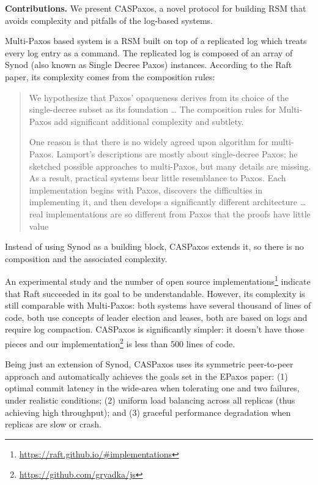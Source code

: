 \documentclass[12pt]{article}
\theoremstyle{definition}
\begin{document}
{\bf Contributions.} We present CASPaxos, a novel protocol for building RSM that avoids complexity and pitfalls of the log-based systems.

Multi-Paxos based system is a RSM built on top of a replicated log which treats every log entry as a command. The replicated log is composed of an array of Synod\cite{lamport01} (also known as Single Decree Paxos) instances. According to the Raft paper, its complexity comes from the composition rules:

\begin{quote}
We hypothesize that Paxos’ opaqueness derives from its choice of the single-decree subset as its foundation \ldots{} The composition rules for Multi-Paxos add significant additional complexity and subtlety.

One reason is that there is no widely agreed upon algorithm for multi-Paxos. Lamport’s descriptions are mostly about single-decree Paxos; he sketched possible approaches to multi-Paxos, but many details are missing. As a result, practical systems bear little resemblance to Paxos. Each implementation begins with Paxos, discovers the difficulties in implementing it, and then develops a significantly different architecture \ldots{} real implementations are so different from Paxos that the proofs have little value
\end{quote}

Instead of using Synod as a building block, CASPaxos extends it, so there is no composition and the associated complexity.

An experimental study\cite{raft} and the number of open source implementations\footnote{\href{https://raft.github.io/\#implementations}{https://raft.github.io/\#implementations}} indicate that Raft succeeded in its goal to be understandable. However, its complexity is still comparable with Multi-Paxos: both systems\cite{chubby}\cite{raft} have several thousand of lines of code, both use concepts of leader election and leases, both are based on logs and require log compaction. CASPaxos is significantly simpler: it doesn't have those pieces and our implementation\footnote{\href{https://github.com/gryadka/js}{https://github.com/gryadka/js}} is less than 500 lines of code.

Being just an extension of Synod, CASPaxos uses its symmetric peer-to-peer approach and automatically achieves the goals set in the EPaxos\cite{epaxos} paper: (1) optimal commit latency in the wide-area when tolerating one and two failures, under realistic conditions; (2) uniform load balancing across all replicas (thus achieving high throughput); and (3) graceful performance degradation when replicas are slow or crash.
\end{document}
